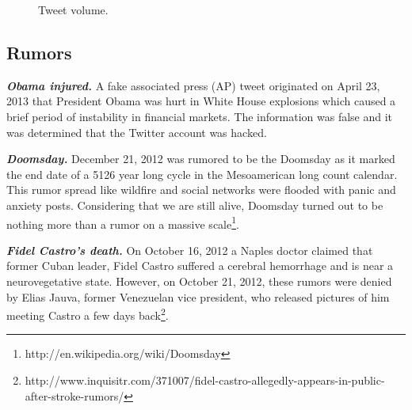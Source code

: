 \begin{figure}[t]
\centering
{}
\vspace{-1em}
\caption{Tweet volume.}
\label{fig:Volume}
\end{figure}

\subsection{Rumors}

\noindent
\textbf{\emph{Obama injured.}}
A fake associated press (AP) tweet originated on April 23, 2013 that President
Obama was hurt in White House explosions which caused a brief period of
instability in financial markets. The information was false
and it was determined that the Twitter account was hacked.

\noindent
\textbf{\emph{Doomsday.}}
December 21, 2012 was rumored to be the Doomsday as it marked the end date of a 5126 year long cycle in the Mesoamerican long count calendar. This rumor
spread like wildfire and social networks were flooded with panic and anxiety posts. Considering that we are still alive, Doomsday turned out to
be nothing more than a rumor on a massive scale\footnote{http://en.wikipedia.org/wiki/Doomsday}.

\noindent
\textbf{\emph{Fidel Castro's death.}}
On October 16, 2012 a Naples doctor claimed that former Cuban leader, Fidel Castro suffered a cerebral hemorrhage and is near a
neurovegetative state. However, on October 21, 2012, these rumors were denied
by Elias Jauva, former Venezuelan vice president, who released pictures of him
meeting Castro a few days back\footnote{http://www.inquisitr.com/371007/fidel-castro-allegedly-appears-in-public-after-stroke-rumors/}.

